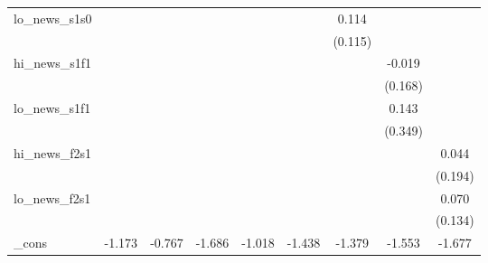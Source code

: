 {\begin{tabular}{l*{8}{c}}
\addlinespace
lo\_news\_s1s0&                     &                     &                     &                     &                     &       0.114         &                     &                     \\
            &                     &                     &                     &                     &                     &     (0.115)         &                     &                     \\
\addlinespace
hi\_news\_s1f1&                     &                     &                     &                     &                     &                     &      -0.019         &                     \\
            &                     &                     &                     &                     &                     &                     &     (0.168)         &                     \\
\addlinespace
lo\_news\_s1f1&                     &                     &                     &                     &                     &                     &       0.143         &                     \\
            &                     &                     &                     &                     &                     &                     &     (0.349)         &                     \\
\addlinespace
hi\_news\_f2s1&                     &                     &                     &                     &                     &                     &                     &       0.044         \\
            &                     &                     &                     &                     &                     &                     &                     &     (0.194)         \\
\addlinespace
lo\_news\_f2s1&                     &                     &                     &                     &                     &                     &                     &       0.070         \\
            &                     &                     &                     &                     &                     &                     &                     &     (0.134)         \\
\addlinespace
\_cons      &      -1.173         &      -0.767         &      -1.686\sym{***}&      -1.018         &      -1.438\sym{***}&      -1.379\sym{***}&      -1.553\sym{***}&      -1.677\sym{***}\\

\end{tabular}}
